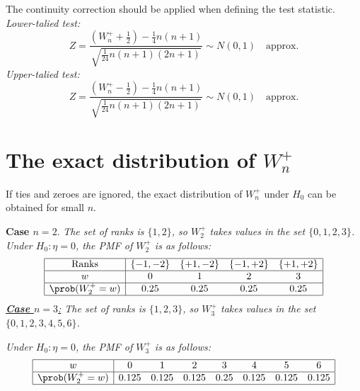 \vspace*{2ex}
The continuity correction should be applied when defining the test statistic.
\bit
\it Lower-talied test:
\[
Z = \frac{(W^{+}_n +\frac{1}{2})- \frac{1}{4}n(n+1)}{\sqrt{\frac{1}{24}n(n+1)(2n+1)}}\sim N(0,1) \quad\text{approx.}
\]
\it Upper-talied test:
\[
Z = \frac{(W^{+}_n -\frac{1}{2})- \frac{1}{4}n(n+1)}{\sqrt{\frac{1}{24}n(n+1)(2n+1)}}\sim N(0,1) \quad\text{approx.}
\]
\eit



\section{The exact distribution of $W^{+}_n$}
If ties and zeroes are ignored, the exact distribution of $W^{+}_n$ under $H_0$ can be obtained for small $n$.

\vspace*{2ex}
\textbf{Case $n = 2$}. 
\bit
\it The set of ranks is $\{1,2\}$, so $W^{+}_2$ takes values in the set $\{0,1,2,3\}$. 
\it Under $H_0:\eta=0$, the  PMF of $W^{+}_2$ is as follows:
\eit
\small
\[\begin{array}{|c|cccc|}\hline
\text{Ranks}			& \{-1,-2\}	& \{+1,-2\}	& \{-1,+2\}	& \{+1,+2\}	\\ \hline
w					& 0	& 1	& 2	& 3 \\ \hline
\prob(W^{+}_2=w)		& 0.25		& 0.25		&  0.25		& 0.25 		\\ \hline
\end{array}\]
\normalsize
\underline{\textbf{Case $n = 3$}:} 
\bit
\it The set of ranks is $\{1,2,3\}$, so $W^{+}_3$ takes values in the set $\{0,1,2,3,4,5,6\}$. 

\it Under $H_0:\eta=0$, the  PMF of $W^{+}_3$ is as follows:
\eit
\small
\[\begin{array}{|c|ccccccc|}\hline
w				& 0		& 1		& 2		& 3 		& 4 		& 5 		& 6		\\ \hline
\prob(W^{+}_2=w)	& 0.125	& 0.125	& 0.125	& 0.25	& 0.125	& 0.125	& 0.125	\\ \hline
\end{array}\]
\normalsize



